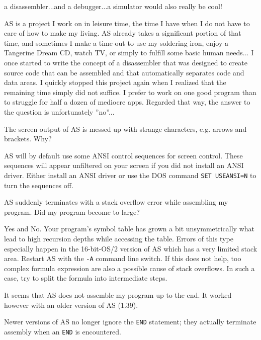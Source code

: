 \documentclass[12pt,twoside]{report}
\newcommand{\tty}[1]{{\tt #1}}
\begin{document}
\begin{description}
{   a disassembler...and a debugger...a simulator would also really be
   cool!}
\item[A:]{AS is a project I work on in leisure time, the time I have when I
   do not have to care of how to make my living.  AS already takes a
   significant portion of that time, and sometimes I make a time-out
   to use my soldering iron, enjoy a Tangerine Dream CD, watch TV, or
   simply to fulfill some basic human needs... I once started to
   write the concept of a disassembler that was designed to create
   source code that can be assembled and that automatically
   separates code and data areas.  I quickly stopped this project
   again when I realized that the remaining time simply did not
   suffice.  I prefer to work on one good program than to struggle for
   half a dozen of mediocre apps.  Regarded that way, the answer to
   the question is unfortunately ''no''...}
\vspace{0.3cm}
\item[Q:]{The screen output of AS is messed up with strange characters, e.g.
   arrows and brackets.  Why?}
\item[A:]{AS will by default use some ANSI control sequences for screen
   control.  These sequences will appear unfiltered on your screen
   if you did not install an ANSI driver.  Either install an ANSI
   driver or use the DOS command \tty{SET USEANSI=N} to turn the
   sequences off.}
\vspace{0.3cm}
\item[Q:]{AS suddenly terminates with a stack overflow error while
   assembling my program.  Did my program become to large?}
\item[A:]{Yes and No.  Your program's symbol table has grown a bit
   unsymmetrically what lead to high recursion depths while accessing
   the table.  Errors of this type especially happen in the
   16-bit-OS/2 version of AS which has a very limited stack area.
   Restart AS with the \tty{-A} command line switch.  If this does not
   help, too complex formula expression are also a possible cause of
   stack overflows.  In such a case, try to split the formula into
   intermediate steps.}
\vspace{0.3cm}
\item[Q:]{It seems that AS does not assemble my program up to the end.  It
   worked however with an older version of AS (1.39).}
\item[A:]{Newer versions of AS no longer ignore the \tty{END} statement; they
   actually terminate assembly when an \tty{END} is encountered.
}
\end{description}
\end{document}
